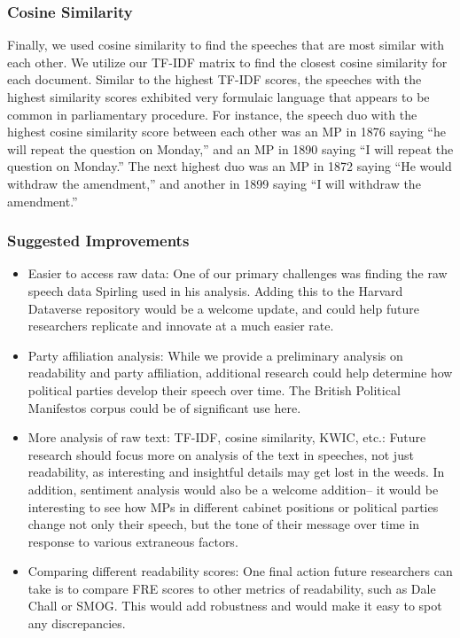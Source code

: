 \documentclass[
  letterpaper,
  DIV=11,
  numbers=noendperiod]{scrartcl}
\begin{document}
\subsubsection{Cosine Similarity}\label{cosine-similarity}

Finally, we used cosine similarity to find the speeches that are most
similar with each other. We utilize our TF-IDF matrix to find the
closest cosine similarity for each document. Similar to the highest
TF-IDF scores, the speeches with the highest similarity scores exhibited
very formulaic language that appears to be common in parliamentary
procedure. For instance, the speech duo with the highest cosine
similarity score between each other was an MP in 1876 saying ``he will
repeat the question on Monday,'' and an MP in 1890 saying ``I will
repeat the question on Monday.'' The next highest duo was an MP in 1872
saying ``He would withdraw the amendment,'' and another in 1899 saying
``I will withdraw the amendment.''

\subsubsection{Suggested Improvements}\label{suggested-improvements}

\begin{itemize}
\item
  Easier to access raw data: One of our primary challenges was finding
  the raw speech data Spirling used in his analysis. Adding this to the
  Harvard Dataverse repository would be a welcome update, and could help
  future researchers replicate and innovate at a much easier rate.
\item
  Party affiliation analysis: While we provide a preliminary analysis on
  readability and party affiliation, additional research could help
  determine how political parties develop their speech over time. The
  British Political Manifestos corpus could be of significant use here.
\item
  More analysis of raw text: TF-IDF, cosine similarity, KWIC, etc.:
  Future research should focus more on analysis of the text in speeches,
  not just readability, as interesting and insightful details may get
  lost in the weeds. In addition, sentiment analysis would also be a
  welcome addition-- it would be interesting to see how MPs in different
  cabinet positions or political parties change not only their speech,
  but the tone of their message over time in response to various
  extraneous factors.
\item
  Comparing different readability scores: One final action future
  researchers can take is to compare FRE scores to other metrics of
  readability, such as Dale Chall or SMOG. This would add robustness and
  would make it easy to spot any discrepancies.
\end{itemize}
\end{document}
